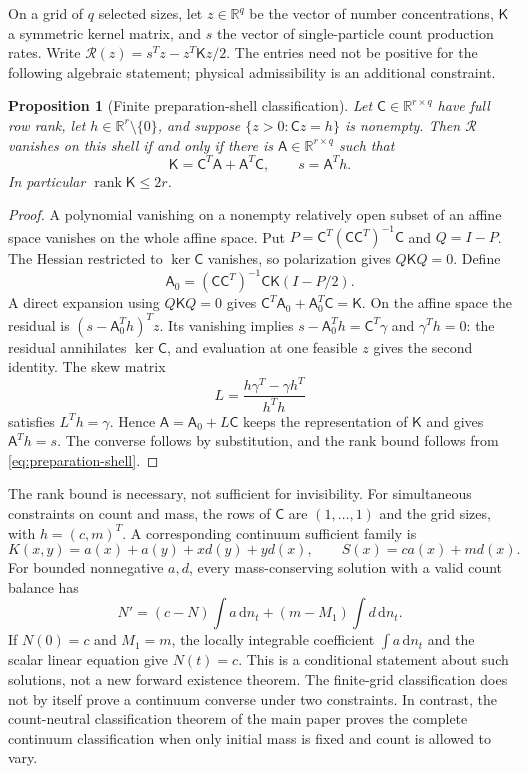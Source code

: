 \documentclass[11pt]{article}
\numberwithin{equation}{section}
\newtheorem{proposition}[theorem]{Proposition}
\theoremstyle{definition}
\theoremstyle{remark}
\newcommand{\R}{\mathbb R}
\newcommand{\dd}{\,\mathrm d}
\newcommand{\1}{\mathbf 1}
\begin{document}
On a grid of $q$ selected sizes, let $z\in\R^q$ be the vector of number
concentrations, $\mathsf K$ a symmetric kernel matrix, and $s$ the vector
of single-particle count production rates. Write
$\mathcal R(z)=s^Tz-z^T\mathsf Kz/2$. The entries need not be positive
for the following algebraic statement; physical admissibility is an
additional constraint.

\begin{proposition}[Finite preparation-shell classification]
\label{prop:preparation-shell}
Let $\mathsf C\in\R^{r\times q}$ have full row rank, let
$h\in\R^r\setminus\{0\}$, and suppose
$\{z>0:\mathsf Cz=h\}$ is nonempty. Then $\mathcal R$ vanishes on this
shell if and only if there is $\mathsf A\in\R^{r\times q}$ such that
\begin{equation}
 \mathsf K=\mathsf C^T\mathsf A+\mathsf A^T\mathsf C,
 \qquad s=\mathsf A^Th.
 \label{eq:preparation-shell}
\end{equation}
In particular $\operatorname{rank}\mathsf K\leq2r$.
\end{proposition}

\begin{proof}
A polynomial vanishing on a nonempty relatively open subset of an affine
space vanishes on the whole affine space. Put
$P=\mathsf C^T(\mathsf C\mathsf C^T)^{-1}\mathsf C$ and $Q=I-P$.
The Hessian restricted to $\ker\mathsf C$ vanishes, so polarization gives
$Q\mathsf KQ=0$. Define
\[
 \mathsf A_0=(\mathsf C\mathsf C^T)^{-1}\mathsf C\mathsf K(I-P/2).
\]
A direct expansion using $Q\mathsf KQ=0$ gives
$\mathsf C^T\mathsf A_0+\mathsf A_0^T\mathsf C=\mathsf K$.
On the affine space the residual is
$(s-\mathsf A_0^Th)^Tz$. Its vanishing implies
$s-\mathsf A_0^Th=\mathsf C^T\gamma$ and $\gamma^Th=0$:
the residual annihilates $\ker\mathsf C$, and evaluation at one feasible
$z$ gives the second identity. The skew matrix
\[
 L=\frac{h\gamma^T-\gamma h^T}{h^Th}
\]
satisfies $L^Th=\gamma$. Hence $\mathsf A=\mathsf A_0+L\mathsf C$
keeps the representation of $\mathsf K$ and gives $\mathsf A^Th=s$.
The converse follows by substitution, and the rank bound follows from
\eqref{eq:preparation-shell}.
\end{proof}

The rank bound is necessary, not sufficient for invisibility.
For simultaneous constraints on count and mass, the rows of
$\mathsf C$ are $(1,\ldots,1)$ and the grid sizes, with $h=(c,m)^T$.
A corresponding continuum sufficient family is
\begin{equation}
 K(x,y)=a(x)+a(y)+xd(y)+yd(x),\qquad S(x)=ca(x)+md(x).
 \label{eq:two-constraint-family}
\end{equation}
For bounded nonnegative $a,d$, every mass-conserving solution with a
valid count balance has
\[
 N'=(c-N)\int a\dd n_t+(m-M_1)\int d\dd n_t.
\]
If $N(0)=c$ and $M_1=m$, the locally integrable coefficient
$\int a\dd n_t$ and the scalar linear equation give $N(t)=c$.
This is a conditional statement about such solutions, not a new forward
existence theorem. The finite-grid classification does not by itself
prove a continuum converse under two constraints. In contrast,
the count-neutral classification theorem of the main paper proves the
complete continuum classification when only initial mass is fixed and
count is allowed to vary.
\end{document}
